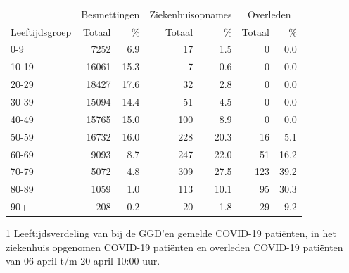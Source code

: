 \documentclass[
  english,
  man,floatsintext]{apa6}
\begin{document}
\begin{table}
\centering\begingroup\fontsize{11}{13}\selectfont

\begin{threeparttable}
\begin{tabular}{lrrrrrr}
\toprule
\multicolumn{1}{c}{ } & \multicolumn{2}{c}{Besmettingen} & \multicolumn{2}{c}{Ziekenhuisopnames} & \multicolumn{2}{c}{Overleden} \\
\cmidrule(l{3pt}r{3pt}){2-3} \cmidrule(l{3pt}r{3pt}){4-5} \cmidrule(l{3pt}r{3pt}){6-7}
Leeftijdsgroep & Totaal & \% & Totaal & \% & Totaal & \%\\
\midrule
0-9 & 7252 & 6.9 & 17 & 1.5 & 0 & 0.0\\
10-19 & 16061 & 15.3 & 7 & 0.6 & 0 & 0.0\\
20-29 & 18427 & 17.6 & 32 & 2.8 & 0 & 0.0\\
30-39 & 15094 & 14.4 & 51 & 4.5 & 0 & 0.0\\
40-49 & 15765 & 15.0 & 100 & 8.9 & 0 & 0.0\\
50-59 & 16732 & 16.0 & 228 & 20.3 & 16 & 5.1\\
60-69 & 9093 & 8.7 & 247 & 22.0 & 51 & 16.2\\
70-79 & 5072 & 4.8 & 309 & 27.5 & 123 & 39.2\\
80-89 & 1059 & 1.0 & 113 & 10.1 & 95 & 30.3\\
90+ & 208 & 0.2 & 20 & 1.8 & 29 & 9.2\\
\bottomrule
\end{tabular}
\begin{tablenotes}
\item[1] Leeftijdsverdeling van bij de GGD’en gemelde COVID-19 patiënten, in het ziekenhuis opgenomen COVID-19 patiënten en overleden COVID-19 patiënten van 06 april t/m 20 april 10:00 uur.
\end{tablenotes}
\end{threeparttable}
\endgroup{}
\end{table}

\newpage
\end{document}
